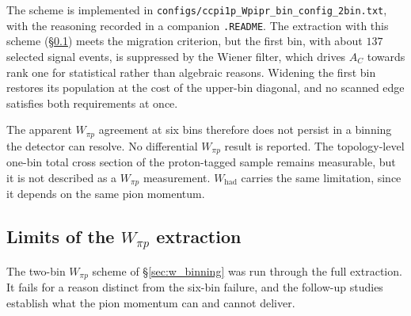 \documentclass[11pt,a4paper]{article}
\begin{document}
The scheme is implemented in \texttt{configs/ccpi1p\_Wpipr\_bin\_config\_2bin.txt}, with the
reasoning recorded in a companion \texttt{.README}. The extraction with this scheme
(\S\ref{sec:wpipr_limits}) meets the migration criterion, but the first bin, with about
$137$ selected signal events, is suppressed by the Wiener filter, which drives $A_C$ towards
rank one for statistical rather than algebraic reasons. Widening the first bin restores its
population at the cost of the upper-bin diagonal, and no scanned edge satisfies both
requirements at once.

The apparent $W_{\pi p}$ agreement at six bins therefore does not persist in a binning the
detector can resolve. No differential $W_{\pi p}$ result is reported. The topology-level one-bin
total cross section of the proton-tagged sample remains measurable, but it is not described as a
$W_{\pi p}$ measurement. $W_\mathrm{had}$ carries the same
limitation, since it depends on the same pion momentum.




\subsection{Limits of the $W_{\pi p}$ extraction}
\label{sec:wpipr_limits}

The two-bin $W_{\pi p}$ scheme of \S\ref{sec:w_binning} was run through the full
extraction. It fails for a reason distinct from the six-bin failure, and the follow-up
studies establish what the pion momentum can and cannot deliver.
\end{document}
